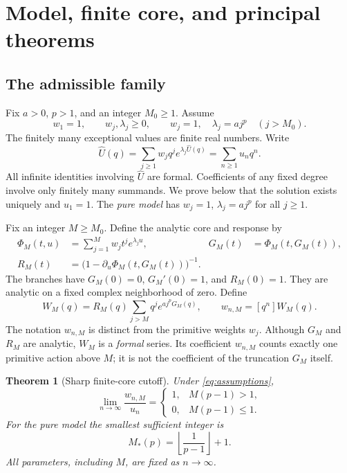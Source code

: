 \documentclass[11pt,a4paper]{article}
\numberwithin{equation}{section}
\newtheorem{theorem}{Theorem}[section]
\theoremstyle{definition}
\theoremstyle{remark}
\newcommand{\Uhat}{\widehat U}\newcommand{\Vhat}{\widehat V}
\begin{document}
\section{Model, finite core, and principal theorems}
\label{sec:main}

\subsection{The admissible family}

Fix $a>0$, $p>1$, and an integer $M_0\ge1$. Assume
\begin{equation}
 w_1=1,\qquad w_j,\lambda_j\ge0,\qquad
 w_j=1,\quad\lambda_j=a j^p\quad(j>M_0).
 \label{eq:assumptions}
\end{equation}
The finitely many exceptional values are finite real numbers. Write
\begin{equation}
 \Uhat(q)=\sum_{j\ge1}w_jq^j e^{\lambda_j\Uhat(q)}
        =\sum_{n\ge1}u_nq^n.
 \label{eq:model}
\end{equation}
All infinite identities involving $\Uhat$ are formal. Coefficients of any
fixed degree involve only finitely many summands. We prove below that the
solution exists uniquely and $u_1=1$.
The \emph{pure model} has $w_j=1$, $\lambda_j=a j^p$ for all $j\ge1$.

Fix an integer $M\ge M_0$. Define the analytic core and response by
\begin{align}
 \Phi_M(t,u)&=\sum_{j=1}^M w_jt^je^{\lambda_ju},
 &G_M(t)&=\Phi_M(t,G_M(t)),\\
 R_M(t)&=\bigl(1-\partial_u\Phi_M(t,G_M(t))\bigr)^{-1}.
 \label{eq:core}
\end{align}
The branches have $G_M(0)=0$, $G_M'(0)=1$, and $R_M(0)=1$.
They are analytic on a fixed complex neighborhood of zero. Define
\begin{equation}
 W_M(q)=R_M(q)\sum_{j>M}q^j e^{a j^pG_M(q)},
 \qquad w_{n,M}=[q^n]W_M(q).
 \label{eq:one-tail}
\end{equation}
The notation $w_{n,M}$ is distinct from the primitive weights $w_j$.
Although $G_M$ and $R_M$ are analytic, $W_M$ is a \emph{formal} series.
Its coefficient $w_{n,M}$ counts exactly one primitive action above $M$;
it is not the coefficient of the truncation $G_M$ itself.

\begin{theorem}[Sharp finite-core cutoff]
\label{thm:cutoff}
Under \eqref{eq:assumptions},
\begin{equation}
 \boxed{\quad
 \lim_{n\to\infty}\frac{w_{n,M}}{u_n}=
 \begin{cases}
 1,&M(p-1)>1,\\[2pt]
 0,&M(p-1)\le1.
 \end{cases}\quad}
 \label{eq:cutoff}
\end{equation}
For the pure model the smallest sufficient integer is
\begin{equation}
 M_*(p)=\left\lfloor\frac1{p-1}\right\rfloor+1.
 \label{eq:mincore}
\end{equation}
All parameters, including $M$, are fixed as $n\to\infty$.
\end{theorem}
\end{document}
